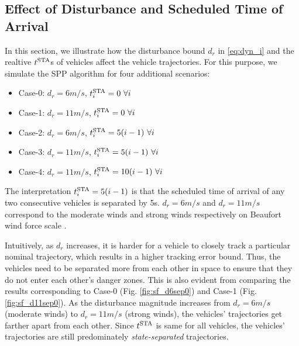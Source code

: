 \subsection{Effect of Disturbance and Scheduled Time of Arrival \label{sec:city_distbEffect}}
In this section, we illustrate how the disturbance bound $d_r$ in \eqref{eq:dyn_i} and the realtive $t^\text{STA}$s of vehicles affect the vehicle trajectories. For this purpose, we simulate the SPP algorithm for four additional scenarios:
\begin{itemize}
\item Case-0: $d_r = 6m/s$, $t^\text{STA}_i = 0 ~\forall i$
\item Case-1: $d_r = 11m/s$, $t^\text{STA}_i = 0 ~\forall i$
\item Case-2: $d_r = 6m/s$, $t^\text{STA}_i = 5(i-1) ~\forall i$
\item Case-3: $d_r = 11m/s$, $t^\text{STA}_i = 5(i-1) ~\forall i$
\item Case-4: $d_r = 11m/s$, $t^\text{STA}_i = 10(i-1) ~\forall i$
\end{itemize}
The interpretation $t^\text{STA}_i = 5(i-1)$ is that the scheduled time of arrival of any two consecutive vehicles is separated by 5s. $d_r = 6m/s$ and $d_r = 11m/s$ correspond to the moderate winds and strong winds respectively on Beaufort wind force scale \cite{Windscale}. 

Intuitively, as $d_r$ increases, it is harder for a vehicle to closely track a particular nominal trajectory, which results in a higher tracking error bound.  Thus, the vehicles need to be separated more from each other in space to ensure that they do not enter each other's danger zones. This is also evident from comparing the results corresponding to Case-0 (Fig. \ref{fig:sf_d6sep0}) and Case-1 (Fig. \ref{fig:sf_d11sep0}). As the disturbance magnitude increases from $d_r = 6m/s$ (moderate winds) to $d_r = 11m/s$ (strong winds), the vehicles' trajectories get farther apart from each other. Since $t^\text{STA}$ is same for all vehicles, the vehicles’ trajectories are still predominately \textit{state-separated} trajectories.

